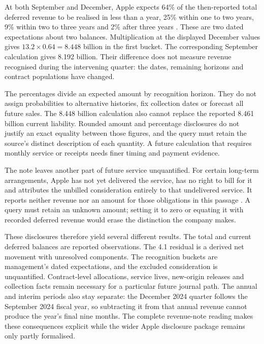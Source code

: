 At both September and December, Apple expects 64\% of the then-reported total
deferred revenue to be realised in less than a year, 25\% within one to two
years, 9\% within two to three years and 2\% after three years
\citep[Note 2, printed p.~36]{apple2024}
\citep[Note 2, printed p.~6]{apple2025q1}. These are two dated expectations
about two balances. Multiplication at the displayed December values gives
$13.2\times0.64=8.448$ billion in the first bucket. The corresponding September
calculation gives 8.192 billion. Their difference does not measure revenue
recognised during the intervening quarter: the dates, remaining horizons and
contract populations have changed.

The percentages divide an expected amount by recognition horizon. They do not
assign probabilities to alternative histories, fix collection dates or forecast
all future sales. The 8.448 billion calculation also cannot replace the reported
8.461 billion current liability. Rounded amount and percentage disclosures do
not justify an exact equality between those figures, and the query must retain
the source's distinct description of each quantity. A future calculation that
requires monthly service or receipts needs finer timing and payment evidence.

The note leaves another part of future service unquantified. For certain
long-term arrangements, Apple has not yet delivered the service, has no right
to bill for it and attributes the unbilled consideration entirely to that
undelivered service. It reports neither revenue nor an amount for those
obligations in this passage \citep[Note 2, printed p.~35]{apple2024}. A query
must retain an unknown amount; setting it to zero or equating it with recorded
deferred revenue would erase the distinction the company makes.

These disclosures therefore yield several different results. The total and
current deferred balances are reported observations. The 4.1 residual is a
derived net movement with unresolved components. The recognition buckets are
management's dated expectations, and the excluded consideration is unquantified.
Contract-level allocations, service lives, new-origin releases and collection
facts remain necessary for a particular future journal path. The annual and
interim periods also stay separate: the December 2024 quarter follows the
September 2024 fiscal year, so subtracting it from that annual revenue cannot
produce the year's final nine months. The complete revenue-note reading makes
these consequences explicit while the wider Apple disclosure package remains
only partly formalised.

